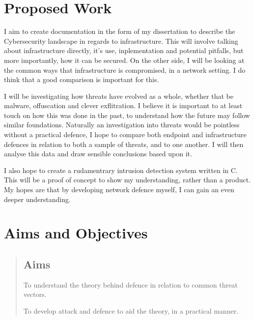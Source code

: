 \section{Proposed Work}
\label{proposed}
I aim to create documentation in the form of my dissertation to describe the Cybersecurity landscape in regards to infrastructure. 
This will involve talking about infrastructure directly, it's use, inplementation and potential pitfalls, but more importantly, how it can be secured.
On the other side, I will be looking at the common ways that infrastructure is compromised, in a network setting. 
I do think that a good comparison is important for this. 

I will be investigating how threats have evolved as a whole,
whether that be malware, offuscation and clever exflitration. I believe it is important to at least touch on how this was done in the past, 
to understand how the future may follow similar foundations. Naturally an investigation into threats would be pointless without a practical defence, 
I hope to compare both endpoint and infrastructure defences in relation to both a sample of threats, and to one another. I will then analyse this data and draw sensible conclusions based upon it.

I also hope to create a rudamentrary intrusion detection system written in C. This will be a proof of concept to show my understanding, rather than a product. My hopes are that by developing network defence myself, 
I can gain an even deeper understanding.

\section{Aims and Objectives}
\begin{quote}
\subsection{Aims}
	To understand the theory behind defence in relation to common threat vectors.

	To develop attack and defence to aid the theory, in a practical manner.
\end{quote}

